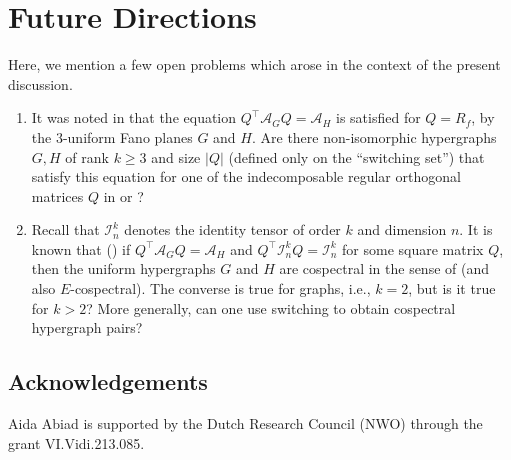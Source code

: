 \documentclass[12pt]{article}
\numberwithin{equation}{section}
\theoremstyle{definition}
\begin{document}
\section{Future Directions}

Here, we mention a few open problems which arose in the context of the present discussion.

\begin{enumerate}
\item It was noted in  that the equation $Q^\top \mathcal{A}_G Q = \mathcal{A}_H$ is satisfied for $Q = R_f$, by the $3$-uniform Fano planes $G$ and $H$. Are there non-isomorphic hypergraphs $G, H$ of rank $k\geq 3$ and size $|Q|$ (defined only on the ``switching set'') that satisfy this equation for one of the indecomposable regular orthogonal matrices $Q$ in  or ?
\item Recall that $\mathcal{I}^k_n$ denotes the identity tensor of order $k$ and dimension $n$. It is known that (\cite[Theorem 2.1, p.~2355]{shao}) if $Q^\top \mathcal{A}_G Q = \mathcal{A}_H$ and $Q^\top \mathcal{I}^k_n Q = \mathcal{I}^k_n$ for some square matrix $Q$, then the uniform hypergraphs $G$ and $H$ are cospectral in the sense of \cite{C2012} (and also $E$-cospectral). The converse is true for graphs, i.e., $k=2$, but is it true for $k > 2$?  More generally, can one use switching to obtain cospectral hypergraph pairs?
\end{enumerate}


\subsection*{Acknowledgements}
\raggedright
Aida Abiad is supported by the Dutch Research Council (NWO) through the grant VI.Vidi.213.085. 

\printbibliography 
\end{document}
